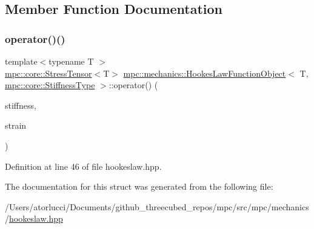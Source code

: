 \subsection{Member Function Documentation}
\mbox{\label{structmpc_1_1mechanics_1_1_hookes_law_function_object_3_01_t_00_01mpc_1_1core_1_1_stiffness_type_01_4_a4d0b04ae39c5feb98e36182a869dbbc6}} 
\subsubsection{\texorpdfstring{operator()()}{operator()()}}
{\footnotesize\ttfamily template$<$typename T $>$ \\
\mbox{\hyperlink{structmpc_1_1core_1_1_stress_tensor}{mpc\+::core\+::\+Stress\+Tensor}}$<$T$>$ \mbox{\hyperlink{structmpc_1_1mechanics_1_1_hookes_law_function_object}{mpc\+::mechanics\+::\+Hookes\+Law\+Function\+Object}}$<$ T, \mbox{\hyperlink{structmpc_1_1core_1_1_stiffness_type}{mpc\+::core\+::\+Stiffness\+Type}} $>$\+::operator() (\begin{DoxyParamCaption}\item[{\mbox{\hyperlink{structmpc_1_1core_1_1_stiffness_tensor}{mpc\+::core\+::\+Stiffness\+Tensor}}$<$ T $>$ \&}]{stiffness,  }\item[{\mbox{\hyperlink{structmpc_1_1core_1_1_strain_tensor}{mpc\+::core\+::\+Strain\+Tensor}}$<$ T $>$ \&}]{strain }\end{DoxyParamCaption})\hspace{0.3cm}{\ttfamily [inline]}}



Definition at line 46 of file hookeslaw.\+hpp.



The documentation for this struct was generated from the following file\+:\begin{DoxyCompactItemize}
\item 
/\+Users/atorlucci/\+Documents/github\+\_\+threecubed\+\_\+repos/mpc/src/mpc/mechanics/\mbox{\hyperlink{hookeslaw_8hpp}{hookeslaw.\+hpp}}\end{DoxyCompactItemize}
